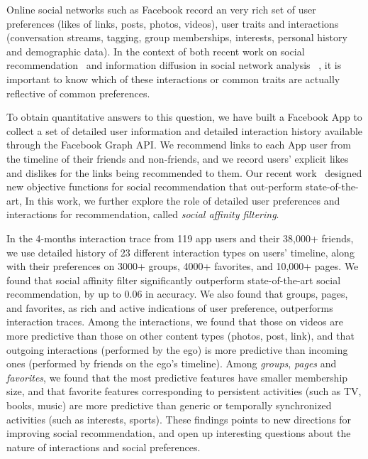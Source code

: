 
\label{sec:introduction}

Online social networks such as Facebook record an very rich set of user
preferences  (likes of links, posts, photos, videos), user traits
and interactions (conversation streams, tagging, group memberships,
interests, personal history and demographic data).  In the context of
both recent work on social recommendation~\cite{sorec,ste,lla} and
information diffusion in social network analysis
~\cite{Goel2012structure,Romero2011hashtag,Bakshy2012chamber}, 
it is important to know which of these interactions or common traits
are actually reflective of common preferences.

To obtain quantitative answers to this question, 
we have built a Facebook App to collect a set of 
detailed user information and detailed interaction history 
available through the Facebook Graph API. 
We recommend links to each App user from the timeline of their 
friends and non-friends, and we record users' explicit likes 
and dislikes for the links being recommended to them. 
Our recent work~\cite{anonymous} designed new objective functions
for social recommendation that out-perform state-of-the-art, 
In this work, we further explore the role of detailed user preferences 
and interactions for recommendation, called {\em social affinity filtering}.

In the 4-months interaction trace from 119 app users and their 38,000+ friends, 
we use detailed history of 23 different interaction types on users' timeline, 
along with their preferences on 3000+ groups, 4000+ favorites, and 10,000+ pages. 
We found that social affinity filter significantly 
outperform state-of-the-art social recommendation, by up to 0.06 in accuracy.
We also found that groups, pages, and favorites, 
as rich and active indications of user preference, outperforms interaction traces. 
Among the interactions, we found that those on videos are more predictive than those on other content types (photos, post, link), and that outgoing interactions (performed by the ego) 
is more predictive than incoming ones (performed by friends on the ego's timeline).
Among {\em groups}, {\em pages} and {\em favorites}, we found that the most  
predictive features have smaller membership size, and that favorite features corresponding to 
persistent activities (such as TV, books, music) are more predictive than generic or 
temporally synchronized activities (such as interests, sports). 
These findings points to new directions for improving social recommendation, 
and open up interesting questions about the nature of interactions and social preferences. 

